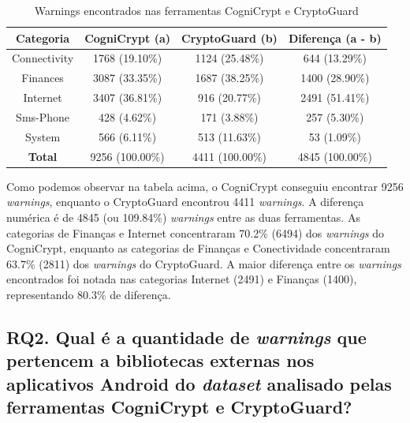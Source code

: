 \begin{table}[!htbp]
  \centering
  \begin{tabular}{|c|c|c|c|}
    \hline
    \textbf{Categoria}   & \textbf{CogniCrypt (a)}   &  \textbf{CryptoGuard (b)}     &  \textbf{Diferença (a - b)} \\ 
    \hline
    Connectivity           & \num{1768} (\num{19.10}\%)  &  \num{1124} (\num{25.48}\%)  & \num{644} (\num{13.29}\%) \\
    Finances                & \num{3087} (\num{33.35}\%) & \num{1687} (\num{38.25}\%) & \num{1400} (\num{28.90}\%)\\
    Internet                 & \num{3407} (\num{36.81}\%) & \num{916} (\num{20.77}\%) & \num{2491} (\num{51.41}\%)\\
    Sms-Phone            & \num{428} (\num{4.62}\%) & \num{171} (\num{3.88}\%) & \num{257} (\num{5.30}\%)\\
    System                  & \num{566} (\num{6.11}\%) & \num{513} (\num{11.63}\%) & \num{53} (\num{1.09}\%)\\
    \hline
    \textbf{Total}          & \num{9256} (\num{100.00}\%) & \num{4411} (\num{100.00}\%) & \num{4845} (\num{100.00}\%)\\
    \hline
  \end{tabular}
    
  \caption{Warnings encontrados nas ferramentas CogniCrypt e CryptoGuard}
  \label{AplicativosComWarning}
\end{table}

Como podemos observar na tabela acima, o CogniCrypt conseguiu encontrar \num{9256} \textit{warnings}, enquanto o CryptoGuard encontrou \num{4411} \textit{warnings}. A diferença numérica é de \num{4845} (ou \num{109.84}\%) \textit{warnings} entre as duas ferramentas. As categorias de Finanças e Internet concentraram \num{70.2}\% (\num{6494}) dos \textit{warnings} do CogniCrypt, enquanto as categorias de Finanças e Conectividade concentraram \num{63.7}\% (\num{2811}) dos \textit{warnings} do CryptoGuard. A maior diferença entre os \textit{warnings} encontrados foi notada nas categorias Internet (\num{2491}) e Finanças (\num{1400}), representando \num{80.3}\% de diferença.

\subsection{RQ2.  Qual é a quantidade de \textit{warnings} que pertencem a bibliotecas externas nos aplicativos Android do \textit{dataset} analisado pelas ferramentas CogniCrypt e CryptoGuard?}

